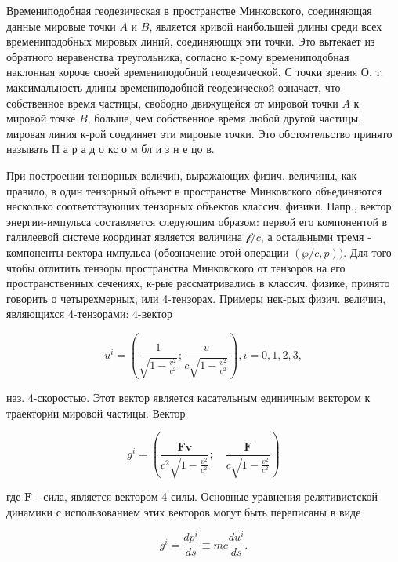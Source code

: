 \documentclass[10pt]{article}
\begin{document}
Времениподобная геодезическая в пространстве Минковского, соединяющая данные мировые точки $A$ и $B$, является кривой наибольшей длины среди всех времениподобных мировых линий, соединяющцх эти точки. Это вытекает из обратного неравенства треугольника, согласно к-рому времениподобная наклонная короче своей времениподобной геодезической. С точки зрения О. т. максимальность длины времениподобной геодезической означает, что собственное время частицы, свободно движущейся от мировой точки $A$ к мировой точке $B$, больше, чем собственное время любой другой частицы, мировая линия к-рой соединяет эти мировые точки. Это обстоятельство принято называть П а р а д о кс о м бл и з н е цо в.

При построении тензорных величин, выражающих физич. величины, как правило, в один тензорный объект в пространстве Минковского объединяются несколько соответствующих тензорных объектов классич. физики. Напр., вектор энергии-импульса составляется следующим образом: первой его компонентой в галилеевой системе координат является величина $\mathscr{f} / c$, а остальными тремя - компоненты вектора импульса (обозначение этой операции $(\wp / c, p))$. Для того чтобы отлитить тензоры пространства Минковского от тензоров на его пространственных сечениях, к-рые рассматривались в классич. физике, принято говорить о четырехмерных, или 4-тензорах. Примеры нек-рых физич. величин, являющихся 4-тензорами: 4-вектор

\[
u^{i}=\left(\frac{1}{\sqrt{1-\frac{v^{2}}{c^{2}}}} ; \frac{v}{c \sqrt{1-\frac{v^{2}}{c^{2}}}}\right), i=0,1,2,3,
\]

наз. 4-скоростью. Этот вектор является касательным единичным вектором к траектории мировой частицы. Вектор

\[
g^{i}=\left(\frac{\boldsymbol{F v}}{c^{2} \sqrt{1-\frac{v^{2}}{c^{2}}}} ; \quad \frac{\boldsymbol{F}}{c \sqrt{1-\frac{v^{2}}{c^{2}}}}\right)
\]

где $\boldsymbol{F}$ - сила, является вектором 4-силы. Основные уравнения релятивистской динамики с использованием этих векторов могут быть переписаны в виде

\[
g^{i}=\frac{d p^{i}}{d s} \equiv m c \frac{d u^{i}}{d s} .
\]
\end{document}
